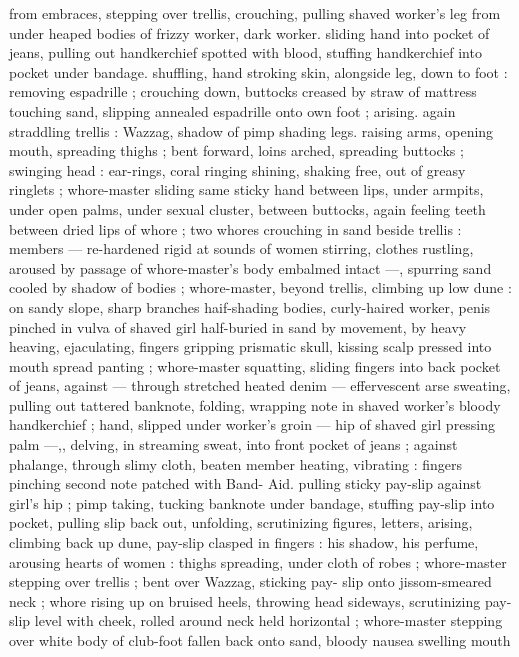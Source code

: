 from embraces, stepping over trellis, crouching, pulling shaved 
worker's leg from under heaped bodies of frizzy worker, dark worker. 
sliding hand into pocket of jeans, pulling out handkerchief spotted 
with blood, stuffing handkerchief into pocket under bandage. 
shuffling, hand stroking skin, alongside leg, down to foot : removing 
espadrille ; crouching down, buttocks creased by straw of mattress 
touching sand, slipping annealed espadrille onto own foot ; arising. 
again straddling trellis : Wazzag, shadow of pimp shading legs. 
raising arms, opening mouth, spreading thighs ; bent forward, loins 
arched, spreading buttocks ; swinging head : ear-rings, coral ringing 
shining, shaking free, out of greasy ringlets ; whore-master sliding 
same sticky hand between lips, under armpits, under open palms, 
under sexual cluster, between buttocks, again feeling teeth between 
dried lips of whore ; two whores crouching in sand beside trellis : 
members --- re-hardened rigid at sounds of women stirring, clothes 
rustling, aroused by passage of whore-master's body embalmed 
intact ---, spurring sand cooled by shadow of bodies ; whore-master, 
beyond trellis, climbing up low dune : on sandy slope, sharp 
branches haif-shading bodies, curly-haired worker, penis pinched in 
vulva of shaved girl half-buried in sand by movement, by heavy 
heaving, ejaculating, fingers gripping prismatic skull, kissing scalp 
pressed into mouth spread panting ; whore-master squatting, sliding 
fingers into back pocket of jeans, against --- through stretched 
heated denim --- effervescent arse sweating, pulling out tattered 
banknote, folding, wrapping note in shaved worker's bloody 
handkerchief ; hand, slipped under worker's groin --- hip of shaved 
girl pressing palm ---,, delving, in streaming sweat, into front pocket 
of jeans ; against phalange, through slimy cloth, beaten member 
heating, vibrating : fingers pinching second note patched with Band- 
Aid. pulling sticky pay-slip against girl's hip ; pimp taking, tucking 
banknote under bandage, stuffing pay-slip into pocket, pulling slip 
back out, unfolding, scrutinizing figures, letters, arising, climbing 
back up dune, pay-slip clasped in fingers : his shadow, his perfume, 
arousing hearts of women : thighs spreading, under cloth of robes ; 
whore-master stepping over trellis ; bent over Wazzag, sticking pay- 
slip onto jissom-smeared neck ; whore rising up on bruised heels, 
throwing head sideways, scrutinizing pay-slip level with cheek, rolled 
around neck held horizontal ; whore-master stepping over white body 
of club-foot fallen back onto sand, bloody nausea swelling mouth 
